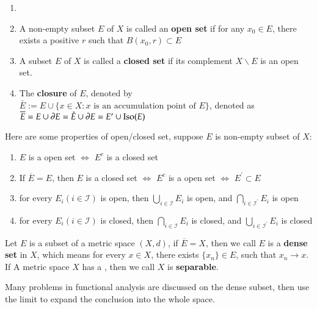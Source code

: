 \begin{definition}\label{def:1.5}
\begin{enumerate}[itemsep=0pt, topsep=0pt]
    \item[]
    \item A non-empty subset $E$ of $X$ is called an \textbf{open set} if for any $x_0 \in E$, there exists a positive $r$ such that $B(x_0, r) \subset E$
    \item A subset $E$ of $X$ is called a \textbf{closed set} if its complement $X \backslash E$ is an open set.
    \item The \textbf{closure} of $E$, denoted by $\bar{E}:=E\cup\{x \in X: x \text{ is an accumulation point of $E$}\}$, denoted as $\overline{E} = E \cup \partial E = \mathring{E} \cup \partial E = E^{\prime} \cup \operatorname{Iso}(E)$
\end{enumerate}
\end{definition}
\begin{Remark}
Here are some properties of open/closed set, suppose $E$ is non-empty subset of $X$:
\begin{enumerate}[itemsep=0pt, topsep=0pt]
    \item $E$ is a open set $\Leftrightarrow$ $E^c$ is a closed set
    \item If $\overline{E} = E$, then $E$ is a closed set $\Leftrightarrow$ $E^c$ is a open set $\Leftrightarrow$ $E^{\prime} \subset E$
    \item for every $E_i (i \in \mathcal{I})$ is open, then $\bigcup\limits_{i\in \mathcal{I}} E_i$ is open, and $\bigcap\limits_{i\in \mathcal{I}^{\prime}} E_i$ is open
    \item for every $E_i (i \in \mathcal{I})$ is closed, then $\bigcap\limits_{i\in \mathcal{I}} E_i$ is closed, and $\bigcup\limits_{i\in \mathcal{I}^{\prime}} E_i$ is closed
\end{enumerate}
\end{Remark}

\begin{definition}\label{def:1.6}
    Let $E$ is a subset of a metric space $(X, d)$, if $\overline{E} = X$, then we call $E$ is a \textbf{dense set} in $X$, which means for every $x \in X$, there exists $\{x_n\} \in E$, such that $x_n \to x$. If A metric space $X$ has a , then we call $X$ is \textbf{separable}.
\end{definition}
\begin{Remark}
Many problems in functional analysis are discussed on the dense subset, then use the limit to expand the conclusion into the whole space.
\end{Remark}

